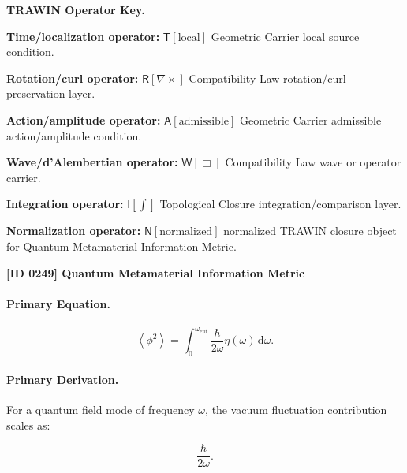\par\vspace{0.45\baselineskip}
\noindent\begin{minipage}[t]{\linewidth}
\begingroup
\small
\raggedright
\textbf{TRAWIN Operator Key.}\par
\noindent\textbf{Time/localization operator:} $\mathsf{T}\!\left[\mathrm{local}\right]$ Geometric Carrier local source condition.\par
\noindent\textbf{Rotation/curl operator:} $\mathsf{R}\!\left[\nabla\times\right]$ Compatibility Law rotation/curl preservation layer.\par
\noindent\textbf{Action/amplitude operator:} $\mathsf{A}\!\left[\mathrm{admissible}\right]$ Geometric Carrier admissible action/amplitude condition.\par
\noindent\textbf{Wave/d'Alembertian operator:} $\mathsf{W}\!\left[\Box\right]$ Compatibility Law wave or operator carrier.\par
\noindent\textbf{Integration operator:} $\mathsf{I}\!\left[\int\right]$ Topological Closure integration/comparison layer.\par
\noindent\textbf{Normalization operator:} $\mathsf{N}\!\left[\mathrm{normalized}\right]$ normalized TRAWIN closure object for Quantum Metamaterial Information Metric.\par
\endgroup
\end{minipage}

\clearpage
\noindent\textbf{[ID 0249] Quantum Metamaterial Information Metric}\par
\vspace{0.35em}
\paragraph{Primary Equation.}
\begin{equation}
\left\langle\phi^2\right\rangle
=
\int_{0}^{\omega_{\mathrm{cut}}}
\frac{\hbar}{2\omega}
\eta(\omega)
\,\mathrm{d}\omega .
\end{equation}

\paragraph{Primary Derivation.}
For a quantum field mode of frequency $\omega$, the vacuum fluctuation contribution scales as:

\begin{equation}
\frac{\hbar}{2\omega}.
\end{equation}


